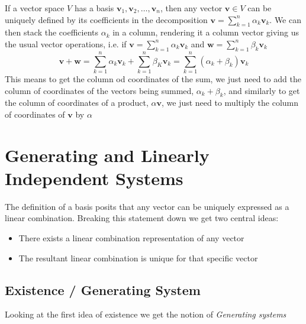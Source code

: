 \documentclass[12pt letter]{report}
\begin{document}
\noindent If a vector space $V$ has a basis $\mathbf{v}_1, \mathbf{v}_2, \ldots, \mathbf{v}_n$, then any vector $\mathbf{v} \in V$
can be uniquely defined by its coefficients in the decomposition $\mathbf{v} = \sum_{k=1}^{n} \alpha_k \mathbf{v}_k$. We
can then stack the coefficients $\alpha_k$ in a column, rendering it a column vector giving us the usual vector
operations, i.e. if $\mathbf{v} = \sum_{k=1}^{n}\alpha_k \mathbf{v}_k$ and $\mathbf{w} = \sum_{k=1}^{n} \beta_k
  \mathbf{v}_k$
\[
  \mathbf{v} + \mathbf{w} = \displaystyle\sum_{k=1}^{n} \alpha_k \mathbf{v}_k + \displaystyle\sum_{k=1}^{n} \beta_K
  \mathbf{v}_k = \displaystyle\sum_{k = 1}^{n} \left( \alpha_k + \beta_k \right) \mathbf{v}_k
\]
This means to get the column od coordinates of the sum, we just need to add the column of coordinates of the vectors being
summed, $\alpha_k + \beta_k$, and similarly to get the column of coordinates of a product, $\alpha \mathbf{v}$, we just
need to multiply the column of coordinates of $\mathbf{v}$ by $\alpha$

\section{Generating and Linearly Independent Systems}

The definition of a basis posits that any vector can be uniquely expressed as a linear combination. Breaking this
statement down we get two central ideas:
\begin{itemize}
  \item There exists a linear combination representation of any vector
  \item The resultant linear combination is unique for that specific vector
\end{itemize}

\subsection{Existence / Generating System}
Looking at the first idea of existence we get the notion of \textit{Generating systems}

\end{document}
